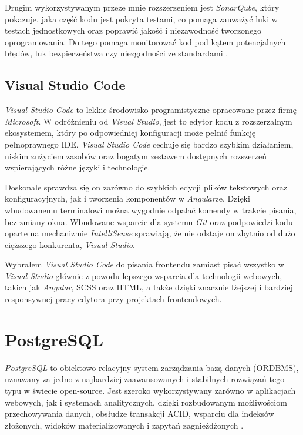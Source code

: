 \documentclass[a4paper,twoside,12pt]{book}
\begin{document}
Drugim wykorzystywanym przeze mnie rozszerzeniem jest \textit{SonarQube}, który pokazuje, jaka część kodu jest pokryta testami, co pomaga zauważyć luki w testach jednostkowych oraz poprawić jakość i niezawodność tworzonego oprogramowania. Do tego pomaga monitorować kod pod kątem potencjalnych błędów, luk bezpieczeństwa czy niezgodności ze standardami \cite{sonarqube2025vs}.

\subsection{Visual Studio Code}

\textit{Visual Studio Code} to lekkie środowisko programistyczne opracowane przez firmę \textit{Microsoft}. W odróżnieniu od \textit{Visual Studio}, jest to edytor kodu z rozszerzalnym ekosystemem, który po odpowiedniej konfiguracji może pełnić funkcję pełnoprawnego IDE. \textit{Visual Studio Code} cechuje się bardzo szybkim działaniem, niskim zużyciem zasobów oraz bogatym zestawem dostępnych rozszerzeń wspierających różne języki i technologie.

Doskonale sprawdza się on zarówno do szybkich edycji plików tekstowych oraz konfiguracyjnych, jak i tworzenia komponentów w \textit{Angular}ze. Dzięki wbudowanemu terminalowi można wygodnie odpalać komendy w trakcie pisania, bez zmiany okna. Wbudowane wsparcie dla systemu \textit{Git} oraz podpowiedzi kodu oparte na mechanizmie \textit{IntelliSense} \cite{vscodeIntellisense2025} sprawiają, że nie odstaje on zbytnio od dużo cięższego konkurenta, \textit{Visual Studio}. 

Wybrałem \textit{Visual Studio Code} do pisania frontendu zamiast pisać wszystko w \textit{Visual Studio} głównie z powodu lepszego wsparcia dla technologii webowych, takich jak \textit{Angular}, SCSS oraz HTML, a także dzięki znacznie lżejszej i bardziej responsywnej pracy edytora przy projektach frontendowych.


\section{PostgreSQL}

\textit{PostgreSQL} to obiektowo-relacyjny system zarządzania bazą danych (ORDBMS), uznawany za jedno z najbardziej zaawansowanych i stabilnych rozwiązań tego typu w świecie open-source. Jest szeroko wykorzystywany zarówno w aplikacjach webowych, jak i systemach analitycznych, dzięki rozbudowanym możliwościom przechowywania danych, obsłudze transakcji ACID, wsparciu dla indeksów złożonych, widoków materializowanych i zapytań zagnieżdżonych \cite{postgresql2025}.
\end{document}
